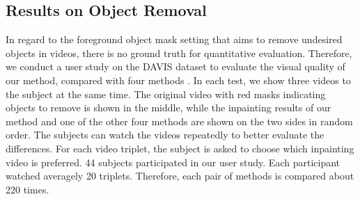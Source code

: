 \subsection{Results on Object Removal}


In regard to the foreground object mask setting that aims to remove undesired objects in videos, there is no ground truth for quantitative evaluation. Therefore,
we conduct a user study on the DAVIS dataset to evaluate the visual quality of our method, compared with four methods \cite{nazeri2019edgeconnect,wang2019video,Kim_2019_CVPR1,Xu_2019_CVPR}.
%
In each test, we show three videos to the subject at the same time. The original video with red masks indicating objects to remove is shown in the middle, while the inpainting results of our method and one of the other four methods are shown on the two sides in random order.
%  
The subjects can watch the videos repeatedly to better evaluate the differences.
For each video triplet, the subject is asked to choose which inpainting video is preferred.
44 subjects participated in our user study. 
Each participant watched averagely 20 triplets. 
Therefore, each pair of methods is compared about 220 times.

%



